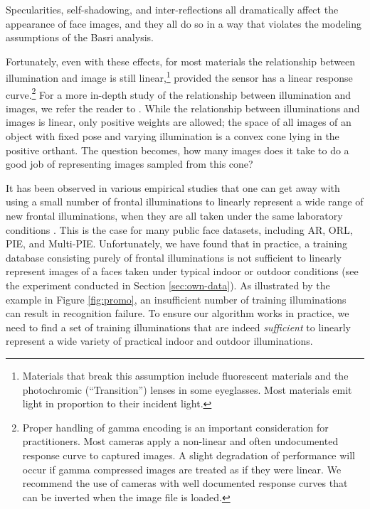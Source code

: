 \documentclass[12pt,journal,draftcls,letterpaper,onecolumn]{IEEEtran}
\begin{document}
Specularities, self-shadowing, and inter-reflections all dramatically affect the appearance of face images,
and they all do so in a way that violates the modeling assumptions of the Basri analysis.

Fortunately, even with these effects, for most materials the relationship between
illumination and image is still linear,\footnote{Materials that break
this assumption include fluorescent materials and the photochromic (``Transition'') lenses
in some eyeglasses.  Most materials emit light in proportion to their
incident light.} provided the sensor has a linear response curve.\footnote{Proper handling of gamma encoding is an important consideration for
practitioners.  Most cameras apply a non-linear and often undocumented response
curve to captured images.  A slight degradation of performance will occur if
gamma compressed images are treated as if they were linear.  We recommend the use
of cameras with well documented response curves that can be inverted when the 
image file is loaded.}
For a more in-depth study 
of the relationship between illumination and images, we refer the reader to
\cite{belhumeur1998set}.
While the relationship between illuminations and images is linear,
only positive weights are allowed; the space of all images of an object with
fixed pose and varying illumination is a convex cone lying in the positive
orthant. The question becomes, how many images does it take to do a good job
of representing images sampled from this cone?

It has been observed in various empirical studies that
one can get away with using a small number of frontal
illuminations to linearly represent a wide range of new frontal
illuminations, when they are all taken under the same laboratory conditions
\cite{Georghiades2001-PAMI}. This is the case for many public
face datasets, including AR, ORL, PIE, and Multi-PIE.
Unfortunately, we have found that in practice, a training
database consisting purely of frontal illuminations is not
sufficient to linearly represent images of a faces taken
under typical indoor or outdoor conditions (see the experiment
conducted in Section \ref{sec:own-data}). As illustrated by the
example in Figure \ref{fig:promo}, an insufficient number of
training illuminations can result in recognition failure. To
ensure our algorithm works in practice, we need to find a set
of training illuminations that are indeed {\em sufficient} to
linearly represent a wide variety of practical indoor and
outdoor illuminations.
\end{document}
